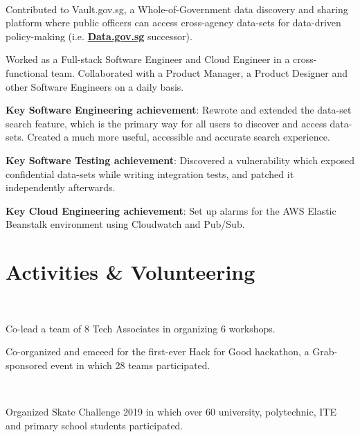 \documentclass[a4paper]{deedy-resume-openfont} %
\begin{document}
\begin{minipage}[t]{0.60\textwidth}
\\
\begin{tightemize}
\item Contributed to Vault.gov.sg, a Whole-of-Government data discovery and sharing platform where public officers can access cross-agency data-sets for data-driven policy-making (i.e. {\bf \href{https://data.gov.sg/}{Data.gov.sg}} successor).
\item Worked as a Full-stack Software Engineer and Cloud Engineer in a cross-functional team. Collaborated with a Product Manager, a Product Designer and other Software Engineers on a daily basis.
\item {\fontsize{10}{10}\selectfont\bfseries Key Software Engineering achievement}: Rewrote and extended the data-set search feature, which is the primary way for all users to discover and access data-sets. Created a much more useful, accessible and accurate search experience.
\item {\fontsize{10}{10}\selectfont\bfseries Key Software Testing achievement}: Discovered a vulnerability which exposed confidential data-sets while writing integration tests, and patched it independently afterwards.
\item {\fontsize{10}{10}\selectfont\bfseries Key Cloud Engineering achievement}: Set up alarms for the AWS Elastic Beanstalk environment using Cloudwatch and Pub/Sub.
\end{tightemize}
\sectionsep


\section{Activities \& Volunteering}
\\
\begin{tightemize}
\item Co-lead a team of 8 Tech Associates in organizing 6 workshops.
\item Co-organized and emceed for the first-ever Hack for Good hackathon, a Grab-sponsored event in which 28 teams participated.
\end{tightemize}
\sectionsep

\\
\begin{tightemize}
\item Organized Skate Challenge 2019 in which over 60 university, polytechnic, ITE and primary school students participated.
\end{tightemize}
\sectionsep


\end{minipage}
\end{document}
